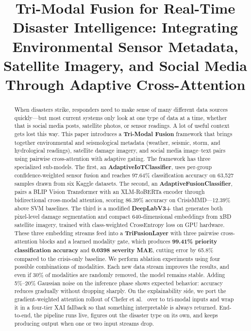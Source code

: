 \documentclass[journal]{IEEEtran}
\begin{document}
\title{Tri-Modal Fusion for Real-Time Disaster Intelligence: Integrating Environmental Sensor Metadata, Satellite Imagery, and Social Media Through Adaptive Cross-Attention}

\author{
}

\maketitle

\begin{abstract}
When disasters strike, responders need to make sense of many different data sources quickly---but most current systems only look at one type of data at a time, whether that is social media posts, satellite photos, or sensor readings. A lot of useful context gets lost this way. This paper introduces a \textbf{Tri-Modal Fusion} framework that brings together environmental and seismological metadata (weather, seismic, storm, and hydrological readings), satellite damage imagery, and social media image--text pairs using pairwise cross-attention with adaptive gating. The framework has three specialized sub-models. The first, an \textbf{AdaptiveIoTClassifier}, uses per-group confidence-weighted sensor fusion and reaches 97.64\% classification accuracy on 63,527 samples drawn from six Kaggle datasets. The second, an \textbf{AdaptiveFusionClassifier}, pairs a BLIP Vision Transformer with an XLM-RoBERTa encoder through bidirectional cross-modal attention, scoring 86.39\% accuracy on CrisisMMD---12.39\% above SVM baselines. The third is a modified \textbf{DeepLabV3+} that generates both pixel-level damage segmentation and compact 640-dimensional embeddings from xBD satellite imagery, trained with class-weighted CrossEntropy loss on GPU hardware. These three embedding streams feed into a \textbf{TriFusionLayer} with three pairwise cross-attention blocks and a learned modality gate, which produces \textbf{99.41\% priority classification accuracy} and \textbf{0.0398 severity MAE}, cutting error by 65.8\% compared to the crisis-only baseline. We perform ablation experiments using four possible combinations of modalities. Each new data stream improves the results, and even if 30\% of modalities are randomly removed, the model remains stable. Adding 5\%--20\% Gaussian noise on the inference phase shows expected behavior: accuracy reduces gradually without dropping sharply. On the explainability side, we port the gradient-weighted attention rollout of Chefer et al.~\cite{chefer2021transformer} over to tri-modal inputs and wrap it in a four-tier XAI fallback so that something interpretable is always returned. End-to-end, the pipeline runs live, figures out the disaster type on its own, and keeps producing output when one or two input streams drop.
\end{abstract}
\end{document}
